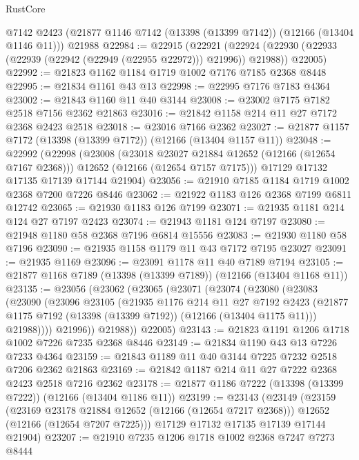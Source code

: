 \begin{lexlean}{RustCore}
\begin{coremodule}
    @7142
    @2423
    (@21877 @1146 @7142 (@13398 (@13399 @7142)) (@12166 (@13404 @1146 @11)))
    @21988
@22984 := @22915
    (@22921
      (@22924 (@22930 (@22933 (@22939 (@22942 (@22949 (@22955 @22972))) @21996)) @21988))
      @22005)
@22992 := @21823 @1162 @1184 @1719 @1002 @7176 @7185 @2368 @8448
@22995 := @21834 @1161 @43 @13
@22998 := @22995 @7176 @7183 @4364
@23002 := @21843 @1160 @11 @40 @3144
@23008 := @23002 @7175 @7182 @2518 @7156 @2362 @21863
@23016 := @21842 @1158 @214 @11 @27 @7172 @2368 @2423 @2518
@23018 := @23016 @7166 @2362
@23027 := @21877 @1157 @7172 (@13398 (@13399 @7172)) (@12166 (@13404 @1157 @11))
@23048 := @22992
    (@22998
      (@23008
        (@23018 @23027 @21884 @12652 (@12166 (@12654 @7167 @2368)))
        @12652
        (@12166 (@12654 @7157 @7175)))
      @17129
      @17132
      @17135
      @17139
      @17144
      @21904)
@23056 := @21910 @7185 @1184 @1719 @1002 @2368 @7200 @7226 @8446
@23062 := @21922 @1183 @126 @2368 @7199 @6811 @12742
@23065 := @21930 @1183 @126 @7199
@23071 := @21935 @1181 @214 @124 @27 @7197 @2423
@23074 := @21943 @1181 @124 @7197
@23080 := @21948 @1180 @58 @2368 @7196 @6814 @15556
@23083 := @21930 @1180 @58 @7196
@23090 := @21935 @1158 @1179 @11 @43 @7172 @7195 @23027
@23091 := @21935 @1169
@23096 := @23091 @1178 @11 @40 @7189 @7194
@23105 := @21877 @1168 @7189 (@13398 (@13399 @7189)) (@12166 (@13404 @1168 @11))
@23135 := @23056
    (@23062
      (@23065
        (@23071
          (@23074
            (@23080
              (@23083
                (@23090
                  (@23096
                    @23105
                    (@21935
                      @1176
                      @214
                      @11
                      @27
                      @7192
                      @2423
                      (@21877 @1175 @7192 (@13398 (@13399 @7192)) (@12166 (@13404 @1175 @11)))
                      @21988))))
              @21996))
          @21988))
      @22005)
@23143 := @21823 @1191 @1206 @1718 @1002 @7226 @7235 @2368 @8446
@23149 := @21834 @1190 @43 @13 @7226 @7233 @4364
@23159 := @21843 @1189 @11 @40 @3144 @7225 @7232 @2518 @7206 @2362 @21863
@23169 := @21842 @1187 @214 @11 @27 @7222 @2368 @2423 @2518 @7216 @2362
@23178 := @21877 @1186 @7222 (@13398 (@13399 @7222)) (@12166 (@13404 @1186 @11))
@23199 := @23143
    (@23149
      (@23159
        (@23169 @23178 @21884 @12652 (@12166 (@12654 @7217 @2368)))
        @12652
        (@12166 (@12654 @7207 @7225)))
      @17129
      @17132
      @17135
      @17139
      @17144
      @21904)
@23207 := @21910 @7235 @1206 @1718 @1002 @2368 @7247 @7273 @8444

\end{coremodule}
\end{lexlean}

